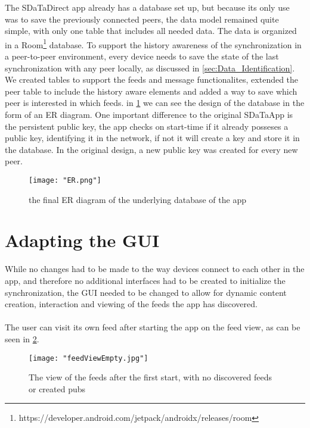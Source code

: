 The SDaTaDirect app already has a database set up, but because its only use was to save the previously connected peers, the data model remained quite simple, with only one table that includes all needed data. The data is organized in a Room\footnote{https://developer.android.com/jetpack/androidx/releases/room} database. To support the history awareness of the synchronization in a peer-to-peer environment, every device needs to save the state of the last synchronization with any peer locally, as discussed in \ref{sec:Data_Identification}. We created tables to support the feeds and message functionalites, extended the peer table to include the history aware elements and added a way to save which peer is interested in which feeds. in \ref{fig:ER} we can see the design of the database in the form of an ER diagram. One important difference to the original SDaTaApp is the persistent public key, the app checks on start-time if it already posseses a public key, identifying it in the network, if not it will create a key and store it in the database. In the original design, a new public key was created for every new peer. 

\begin{figure}[!h]
	\centering
	\texttt{[image: "ER.png"]}
	\caption{the final ER diagram of the underlying database of the app}
	\label{fig:ER}
\end{figure}

\section{Adapting the GUI}

While no changes had to be made to the way devices connect to each other in the app, and therefore no additional interfaces had to be created to initialize the synchronization, the GUI needed to be changed to allow for dynamic content creation, interaction and viewing of the feeds the app has discovered. 
\\
\\
The user can visit its own feed after starting the app on the feed view, as can be seen in \ref{fig:emptyFeed}.
\clearpage
\begin{figure}[!h]
	\centering
	\texttt{[image: "feedViewEmpty.jpg"]}
	\caption{The view of the feeds after the first start, with no discovered feeds or created pubs}
	\label{fig:emptyFeed}
\end{figure}
 
